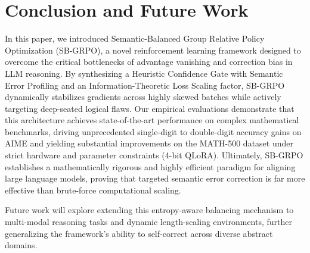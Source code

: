 \clearpage
\section{Conclusion and Future Work}
In this paper, we introduced Semantic-Balanced Group Relative Policy Optimization (SB-GRPO), a novel reinforcement learning framework designed to overcome the critical bottlenecks of advantage vanishing and correction bias in LLM reasoning. By synthesizing a Heuristic Confidence Gate with Semantic Error Profiling and an Information-Theoretic Loss Scaling factor, SB-GRPO dynamically stabilizes gradients across highly skewed batches while actively targeting deep-seated logical flaws. Our empirical evaluations demonstrate that this architecture achieves state-of-the-art performance on complex mathematical benchmarks, driving unprecedented single-digit to double-digit accuracy gains on AIME and yielding substantial improvements on the MATH-500 dataset under strict hardware and parameter constraints (4-bit QLoRA). Ultimately, SB-GRPO establishes a mathematically rigorous and highly efficient paradigm for aligning large language models, proving that targeted semantic error correction is far more effective than brute-force computational scaling. 

Future work will explore extending this entropy-aware balancing mechanism to multi-modal reasoning tasks and dynamic length-scaling environments, further generalizing the framework's ability to self-correct across diverse abstract domains.